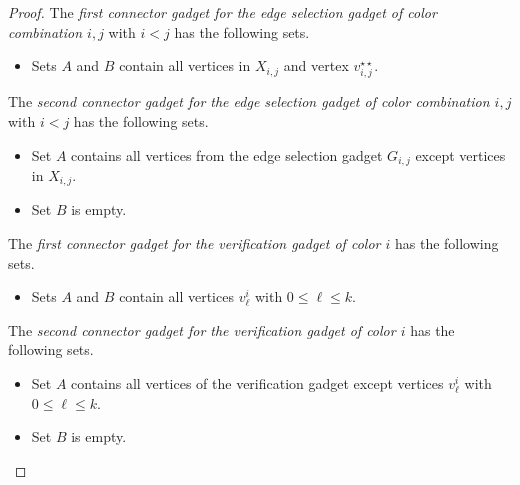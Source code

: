 \documentclass[a4paper,UKenglish,cleveref, autoref, thm-restate, anonymous]{lipics-v2021}
\begin{document}
\begin{proof}
    The \emph{first connector gadget for the edge selection gadget of color combination $i,j$} with $i<j$ has the following sets.
    \begin{itemize}
        \item Sets $A$ and $B$ contain all vertices in $X_{i,j}$ and vertex $v_{i,j}^{\star\star}$.
    \end{itemize}
    The \emph{second connector gadget for the edge selection gadget of color combination $i,j$} with $i<j$ has the following sets.
    \begin{itemize}
        \item Set $A$ contains all vertices from the edge selection gadget $G_{i,j}$ except vertices in $X_{i,j}$.
        \item Set $B$ is empty.
    \end{itemize}
    The \emph{first connector gadget for the verification gadget of color $i$} has the following sets.
    \begin{itemize}
        \item Sets $A$ and $B$ contain all vertices $v^i_\ell$ with $0\le \ell\le k$.
    \end{itemize}
The \emph{second connector gadget for the verification gadget of color $i$} has the following sets.
    \begin{itemize}
        \item Set $A$ contains all vertices of the verification gadget except vertices $v^i_\ell$ with $0\le \ell \le k$.
        \item Set $B$ is empty.
    \end{itemize}


\end{proof}
\end{document}
